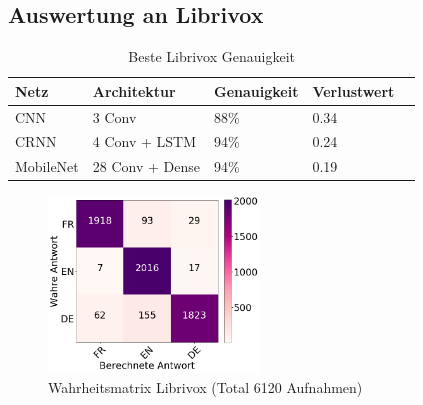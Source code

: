 \subsection{Auswertung an Librivox}

\begin{table}[h]
	\centering
	\begin{tabular}{lllll}
		\hline
		Netz & Architektur     & Genauigkeit & Verlustwert \\ \hline
		CNN  & 3 Conv          & 88\%     & 0.34  \\
		CRNN & 4 Conv + LSTM   & 94\%     & 0.24  \\
		MobileNet  & 28 Conv + Dense & 94\%     & 0.19  \\ \hline
	\end{tabular}
	\caption{Beste Librivox Genauigkeit}
	\label{table:test_lib}
\end{table}

 \begin{figure}[hbt]
	\centering
		\includegraphics[width=0.5\textwidth]{assets/matrix_lib.png}
	\caption{Wahrheitsmatrix Librivox (Total 6120 Aufnahmen)}
	\label{img:matrix_lib}
\end{figure}
